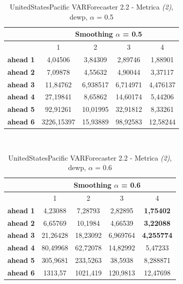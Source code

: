 \documentclass[12pt,a4paper,oneside,openright]{book}
\begin{document}
\medskip

\begin{table}[H]
\centering
\begin{tabular}{|c|c|c|c|c|}
\hline
 & \multicolumn{4}{|c|}{Smoothing $\alpha$ = 0.5} \\
\hline
& 1 & 2 & 3 & 4 \\
\hline
\textbf{ahead 1} & 4,04506 & 3,84309 & 2,89746 & 1,88901\\
\hline
\textbf{ahead 2} & 7,09878 & 4,55632 & 4,90044 & 3,37117\\ 
\hline
\textbf{ahead 3} & 11,84762 & 6,938517 & 6,714971 & 4,476137\\
\hline
\textbf{ahead 4} & 27,19841 & 8,65862 & 14,60174 & 5,44206\\ 
\hline
\textbf{ahead 5} & 92,91261 & 10,01995 & 32,91812 & 8,33261\\
\hline
\textbf{ahead 6} & 3226,15397 & 15,93889 & 98,92583 & 12,58244\\  
\hline
\end{tabular} \\
\caption{UnitedStatesPacific VARForecaster 2.2 - Metrica \textit{(2)}, dewp, $\alpha$ = 0.5}
\end{table} 

\medskip

\begin{table}[H]
\centering
\begin{tabular}{|c|c|c|c|c|}
\hline
 & \multicolumn{4}{|c|}{Smoothing $\alpha$ = 0.6} \\
\hline
& 1 & 2 & 3 & 4 \\
\hline
\textbf{ahead 1} & 4,23088 & 7,28793 & 2,82895 & \textbf{1,75402} \\
\hline
\textbf{ahead 2} & 6,65769 & 10,1984 & 4,66539 & \textbf{3,22088}\\ 
\hline
\textbf{ahead 3} & 21,26428 & 18,23092 & 6,969764 & \textbf{4,255774} \\
\hline
\textbf{ahead 4} & 80,49968 & 62,72078 & 14,82992 & 5,47233\\ 
\hline
\textbf{ahead 5} & 305,9681 & 233,5263 & 38,5938 & 8,288871\\
\hline
\textbf{ahead 6} & 1313,57 & 1021,419 & 120,9813 & 12,47698\\ 
\hline
\end{tabular} \\
\caption{UnitedStatesPacific VARForecaster 2.2 - Metrica \textit{(2)}, dewp, $\alpha$ = 0.6}
\end{table} 
\end{document}
